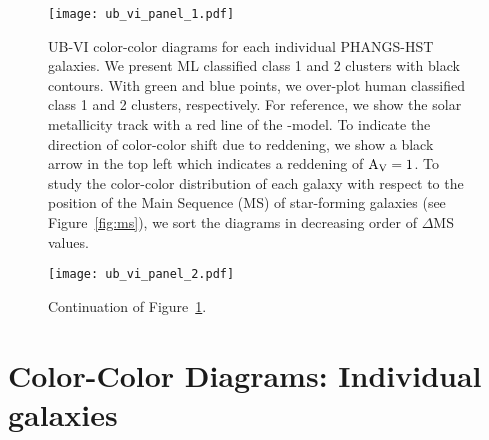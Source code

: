 \documentclass[linenumbers]{aastex63}
\begin{document}
{%

\begin{figure*}
\texttt{[image: ub\_vi\_panel\_1.pdf]}
 \caption{UB-VI color-color diagrams for each individual PHANGS-HST galaxies. We present ML classified class 1 and 2 clusters with black contours. With green and blue points, we over-plot human classified class 1 and 2 clusters, respectively. For reference, we show the solar metallicity track with a red line of the -model. To indicate the direction of color-color shift due to reddening, we show a black arrow in the top left which indicates a reddening of ${\rm A_{V} = 1}$. To study the color-color distribution of each galaxy with respect to the position of the Main Sequence (MS) of star-forming galaxies (see Figure~\ref{fig:ms}), we sort the diagrams in decreasing order of $\Delta$MS values.}
 \label{fig:ub_vi_1}
\end{figure*}
%
\begin{figure*}
\texttt{[image: ub\_vi\_panel\_2.pdf]}
 \caption{Continuation of Figure~\ref{fig:ub_vi_1}.}
 \label{fig:ub_vi_2}
\end{figure*}

\section{Color-Color Diagrams: Individual galaxies}\label{ssect:cc_sf}
%
%

}
\end{document}
